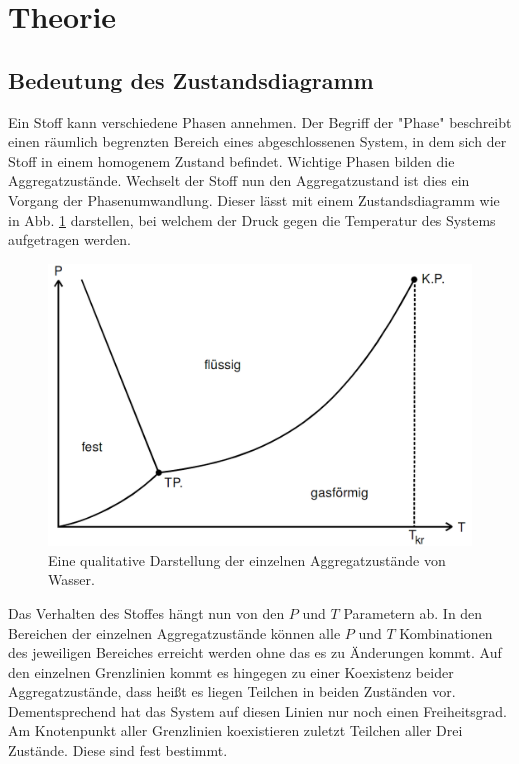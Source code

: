 
\section{Theorie}
\label{sec:Theorie}
\subsection{Bedeutung des Zustandsdiagramm}
Ein Stoff kann verschiedene Phasen annehmen. Der Begriff der "Phase" beschreibt
 einen räumlich begrenzten Bereich eines abgeschlossenen System, in dem sich der Stoff
  in einem homogenem Zustand befindet. Wichtige Phasen bilden die Aggregatzustände.
  Wechselt der Stoff nun den Aggregatzustand ist dies ein Vorgang der Phasenumwandlung.
  Dieser lässt mit einem Zustandsdiagramm wie in Abb. \ref{fig:diagram} darstellen, bei welchem der Druck gegen
  die Temperatur des Systems aufgetragen werden.
  \begin{figure}
	\centering
	\includegraphics[width=\linewidth-150pt,height=\textheight-150pt,keepaspectratio]{content/Bilder/zustand.png}
	\caption{Eine qualitative Darstellung der einzelnen Aggregatzustände von Wasser\cite{V203}.}
	\label{fig:diagram}
\end{figure}
  Das Verhalten des Stoffes hängt nun von den $P$ und $T$ Parametern ab.
  In den Bereichen der einzelnen Aggregatzustände können alle $P$ und $T$
   Kombinationen des jeweiligen Bereiches erreicht werden ohne das es zu Änderungen kommt.
    Auf den einzelnen Grenzlinien kommt es hingegen zu einer Koexistenz beider
    Aggregatzustände, dass heißt es liegen Teilchen in beiden Zuständen vor.
    Dementsprechend hat das System auf diesen Linien nur noch einen Freiheitsgrad.
    Am Knotenpunkt aller Grenzlinien koexistieren zuletzt Teilchen aller Drei
     Zustände. Diese sind fest bestimmt.

